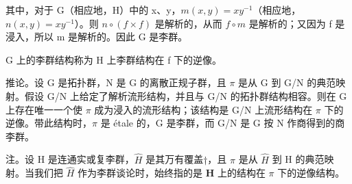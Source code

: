 其中，对于 G（相应地，H）中的 x、y，\(m(x,y)=xy^{-1}\)（相应地，\(n(x,y)=xy^{-1}\)）。则 \(n\circ(f\times f)\) 是解析的，从而 \(f\circ m\) 是解析的；又因为 f 是浸入，所以 m 是解析的。因此 G 是李群。

G 上的李群结构称为 H 上李群结构在 f 下的逆像。

推论。设 G 是拓扑群，N 是 G 的离散正规子群，且 \(\pi\) 是从 G 到 G/N 的典范映射。假设 G/N 上给定了解析流形结构，并且与 G/N 的拓扑群结构相容。则在 G 上存在唯一一个使 \(\pi\) 成为浸入的流形结构；该结构是 G/N 上流形结构在 \(\pi\) 下的逆像。带此结构时，\(\pi\) 是 étale 的，G 是李群，而 G/N 是 G 按 N 作商得到的商李群。

注。设 H 是连通实或复李群，\(\hat{H}\) 是其万有覆盖\(\dagger\)，且 \(\pi\) 是从 \(\hat{H}\) 到 H 的典范映射。当我们把 \(\hat{H}\) 作为李群谈论时，始终指的是 \(\mathbf{H}\) 上的结构在 \(\pi\) 下的逆像结构。

